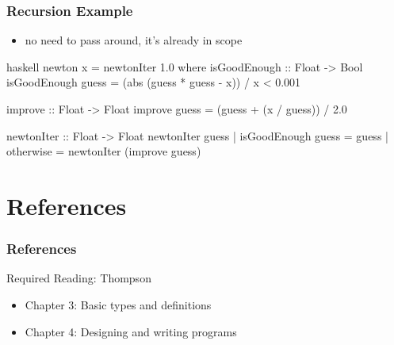 \documentclass[dvipsnames]{beamer}
\theoremstyle{plain}
\begin{document}
\begin{frame}[fragile]
  \frametitle{Recursion Example}

  \begin{exampleblock}{}
    \begin{itemize}
      \item no need to pass  around, it's already in scope
    \end{itemize}

    \pause
    \smallskip
    \begin{pygments}{haskell}
newton x = newtonIter 1.0
  where
    isGoodEnough :: Float -> Bool
    isGoodEnough guess =
        (abs (guess * guess - x)) / x < 0.001

    improve :: Float -> Float
    improve guess = (guess + (x / guess)) / 2.0

    newtonIter :: Float -> Float
    newtonIter guess
      | isGoodEnough guess = guess
      | otherwise          = newtonIter (improve guess)
    \end{pygments}
  \end{exampleblock}
\end{frame}

\section*{References}

\begin{frame}
  \frametitle{References}

  \begin{block}{Required Reading: Thompson}
    \begin{itemize}
      \item Chapter 3: \alert{Basic types and definitions}
      \item Chapter 4: \alert{Designing and writing programs}
    \end{itemize}
  \end{block}
\end{frame}
\end{document}
